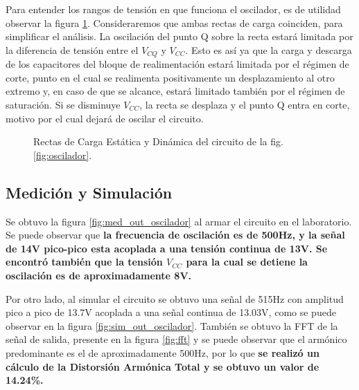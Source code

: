 \documentclass[a4paper, 10pt, spanish]{article}
\begin{document}
        Para entender los rangos de tensión en que funciona el oscilador, es de utilidad observar la figura \ref{fig:rectas_carga_oscil}. Consideraremos que ambas rectas de carga coinciden, para simplificar el análisis. La oscilación del punto Q sobre la recta estará limitada por la diferencia de tensión entre el $V_{CQ}$ y $V_{CC}$. Esto es así ya que la carga y descarga de los capacitores del bloque de realimentación estará limitada por el régimen de corte, punto en el cual se realimenta positivamente un desplazamiento al otro extremo y, en caso de que se alcance, estará limitado también por el régimen de saturación. Si se disminuye $V_{CC}$, la recta se desplaza y el punto Q entra en corte, motivo por el cual dejará de oscilar el circuito.

        \begin{figure}[h]
            \begin{center}
            \end{center}
      \caption{Rectas de Carga Estática y Dinámica del circuito de la fig. \ref{fig:oscilador}.}
      \label{fig:rectas_carga_oscil}
      \end{figure}

        \subsection{Medición y Simulación}
        Se obtuvo la figura \ref{fig:med_out_oscilador} al armar el circuito en el laboratorio. Se puede observar que \textbf{la frecuencia de oscilación es de 500Hz, y la señal de 14V pico-pico esta acoplada a una tensión continua de 13V. Se encontró también que la tensión $V_{CC}$ para la cual se detiene la oscilación es de aproximadamente 8V.}

        Por otro lado, al simular el circuito se obtuvo una señal de 515Hz con amplitud pico a pico de 13.7V acoplada a una señal continua de 13.03V, como se puede observar en la figura \ref{fig:sim_out_oscilador}. También se obtuvo la FFT de la señal de salida, presente en la figura \ref{fig:fft} y se puede observar que el armónico predominante es el de aproximadamente 500Hz, por lo que \textbf{se realizó un cálculo de la Distorsión Armónica Total y se obtuvo un valor de 14.24\%.}
\end{document}
